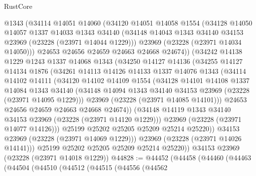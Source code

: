 \begin{lexlean}{RustCore}
\begin{coremodule}
          @1343
          (@34114
            @14051
            @14060
            (@34120
              @14051
              @14058
              @1554
              (@34128
                @14050
                @14057
                @1337
                @14033
                @1343
                @34140
                (@34148 @14043 @1343 @34140 @34153 @23969 (@23228 (@23971 @14044 @1229)))
                @23969
                (@23228 (@23971 @14034 @14050)))
              @24653
              @24656
              @24659
              @24663
              @24668
              @24674))
          (@34242
            @14138
            @1229
            @1243
            @1337
            @14068
            @1343
            (@34250
              @14127
              @14136
              (@34255
                @14127
                @14134
                @1876
                (@34261
                  @14113
                  @14126
                  @14133
                  @1337
                  @14076
                  @1343
                  (@34114
                    @14102
                    @14111
                    (@34120
                      @14102
                      @14109
                      @1554
                      (@34128
                        @14101
                        @14108
                        @1337
                        @14084
                        @1343
                        @34140
                        (@34148 @14094 @1343 @34140 @34153 @23969 (@23228 (@23971 @14095 @1229)))
                        @23969
                        (@23228 (@23971 @14085 @14101)))
                      @24653
                      @24656
                      @24659
                      @24663
                      @24668
                      @24674))
                  (@34148 @14119 @1343 @34140 @34153 @23969 (@23228 (@23971 @14120 @1229)))
                  @23969
                  (@23228 (@23971 @14077 @14126)))
                @25199
                @25202
                @25205
                @25209
                @25214
                @25220))
            @34153
            @23969
            (@23228 (@23971 @14069 @1229)))
          @23969
          (@23228 (@23971 @14026 @14141)))
        @25199
        @25202
        @25205
        @25209
        @25214
        @25220))
    @34153
    @23969
    (@23228 (@23971 @14018 @1229))
@44828 := @44452
    (@44458
      (@44460
        (@44463
          (@44504
            (@44510
              (@44512
                (@44515
                  (@44556
                    (@44562

\end{coremodule}
\end{lexlean}

